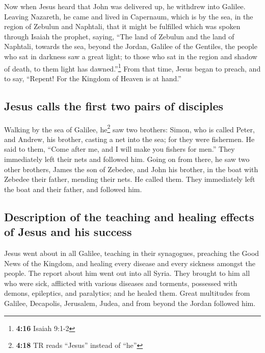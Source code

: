  Now when Jesus heard that John was delivered up, he
withdrew into Galilee.  Leaving Nazareth, he came and
lived in Capernaum, which is by the sea, in the region of Zebulun and
Naphtali,  that it might be fulfilled which was spoken
through Isaiah the prophet, saying,  ``The land of
Zebulun and the land of Naphtali, towards the sea, beyond the Jordan,
Galilee of the Gentiles,  the people who sat in darkness
saw a great light; to those who sat in the region and shadow of death,
to them light has dawned.''\footnote{\textbf{4:16} Isaiah 9:1-2}
 From that time, Jesus began to preach, and to say,
``Repent! For the Kingdom of Heaven is at hand.''

\hypertarget{jesus-calls-the-first-two-pairs-of-disciples}{%
\subsection{Jesus calls the first two pairs of
disciples}\label{jesus-calls-the-first-two-pairs-of-disciples}}

 Walking by the sea of Galilee, he\footnote{\textbf{4:18}
  TR reads ``Jesus'' instead of ``he''} saw two brothers: Simon, who is
called Peter, and Andrew, his brother, casting a net into the sea; for
they were fishermen.  He said to them, ``Come after me,
and I will make you fishers for men.''  They immediately
left their nets and followed him.  Going on from there,
he saw two other brothers, James the son of Zebedee, and John his
brother, in the boat with Zebedee their father, mending their nets. He
called them.  They immediately left the boat and their
father, and followed him.

\hypertarget{description-of-the-teaching-and-healing-effects-of-jesus-and-his-success}{%
\subsection{Description of the teaching and healing effects of Jesus and
his
success}\label{description-of-the-teaching-and-healing-effects-of-jesus-and-his-success}}

 Jesus went about in all Galilee, teaching in their
synagogues, preaching the Good News of the Kingdom, and healing every
disease and every sickness amongst the people.  The
report about him went out into all Syria. They brought to him all who
were sick, afflicted with various diseases and torments, possessed with
demons, epileptics, and paralytics; and he healed them. 
Great multitudes from Galilee, Decapolis, Jerusalem, Judea, and from
beyond the Jordan followed him.

